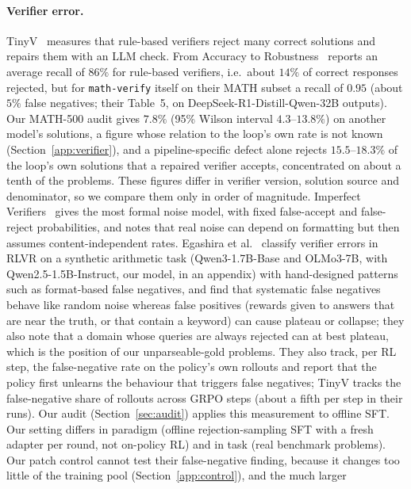 \documentclass[runningheads]{llncs}
\begin{document}
\paragraph{Verifier error.}
TinyV~\cite{ref_tinyv} measures that rule-based verifiers reject many correct
solutions and repairs them with an LLM check. From Accuracy to
Robustness~\cite{ref_robustness} reports an average recall of $86\%$ for
rule-based verifiers, i.e.\ about $14\%$ of correct responses rejected, but for
\texttt{math-verify} itself on their MATH subset a recall of $0.95$ (about $5\%$
false negatives; their Table~5, on DeepSeek-R1-Distill-Qwen-32B outputs). Our
MATH-500 audit gives $7.8\%$ (95\% Wilson interval $4.3$--$13.8\%$) on another
model's solutions, a figure whose relation to the loop's own rate is not known
(Section~\ref{app:verifier}), and a pipeline-specific defect alone rejects
$15.5$--$18.3\%$ of the loop's own solutions that a repaired verifier accepts, concentrated on about a tenth of the problems. These figures differ in
verifier version, solution source and denominator, so we compare them only in
order of magnitude. Imperfect Verifiers~\cite{ref_imperfect} gives the most formal noise model,
with fixed false-accept and false-reject probabilities, and notes that real noise
can depend on formatting but then assumes content-independent rates. Egashira et
al.~\cite{ref_delayplateau} classify verifier errors in RLVR on a synthetic
arithmetic task (Qwen3-1.7B-Base and OLMo3-7B, with Qwen2.5-1.5B-Instruct, our
model, in an appendix) with hand-designed patterns such as format-based false
negatives, and find that systematic false negatives behave like random noise
whereas false positives (rewards given to answers that are near the truth, or
that contain a keyword) can cause plateau or collapse; they also note that a
domain whose queries are always rejected can at best plateau, which is the
position of our unparseable-gold problems. They also track, per RL step, the
false-negative rate on the policy's own rollouts and report that the policy
first unlearns the behaviour that triggers false negatives; TinyV tracks the
false-negative share of rollouts across GRPO steps (about a fifth per step in
their runs). Our audit (Section~\ref{sec:audit}) applies this measurement to
offline SFT. Our
setting differs in paradigm (offline rejection-sampling SFT with a fresh adapter
per round, not on-policy RL) and in task (real benchmark problems). Our patch
control cannot test their false-negative finding, because it changes too little
of the training pool (Section~\ref{app:control}), and the much larger
\end{document}
